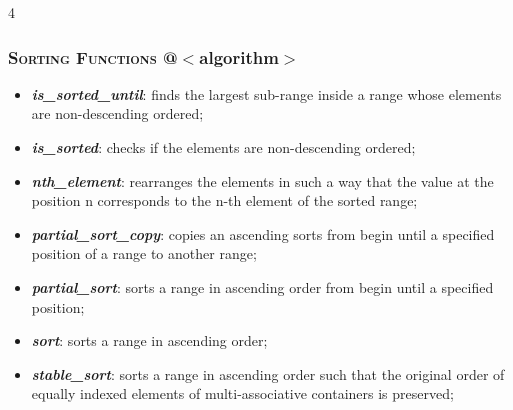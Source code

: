 \documentclass[10pt]{article}
\begin{document}
\begin{multicols*}{4}
{\subsubsection*{\textsc{Sorting Functions} @$<$algorithm$>$} 
\begin{itemize}[leftmargin=*,topsep=0.25pt]
  \setlength\itemsep{-1.8pt}
	\item  \emph{\textbf{is\_sorted\_until}}: finds the largest sub-range inside a range whose elements are non-descending ordered;
	\item  \emph{\textbf{is\_sorted}}: checks if the elements are non-descending ordered;
	\item  \emph{\textbf{nth\_element}}: rearranges the elements in such a way that the value at the position n corresponds to the n-th element of the sorted range;
	\item  \emph{\textbf{partial\_sort\_copy}}: copies an ascending sorts from begin until a specified position of a range to another range;
	\item  \emph{\textbf{partial\_sort}}: sorts a range in ascending order from begin until a specified position;
	\item  \emph{\textbf{sort}}: sorts a range in ascending order;
	\item  \emph{\textbf{stable\_sort}}: sorts a range in ascending order such that the original order of equally indexed elements of multi-associative containers is preserved;
\end{itemize}

}
\end{multicols*}
\end{document}
